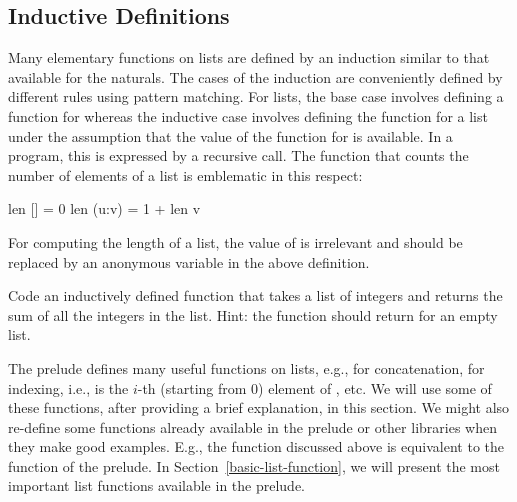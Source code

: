 \subsection{Inductive Definitions}

Many elementary functions on lists are defined by an induction similar
to that available for the naturals.
The cases of the induction are conveniently defined by
different rules using pattern matching.
For lists, the base case involves defining a function for \code{[]}
whereas the inductive case involves defining the function for
a list  under the assumption that the value of the
function for  is available.
In a program, this is expressed by a recursive call.
The function that counts the number of elements of a list
is emblematic in this respect:
%
\begin{prog}
len []    = 0
len (u:v) = 1 + len v
\end{prog}
%
For computing the length of a list, the value of  is irrelevant and
 should be replaced by an anonymous variable in the above
definition.
%
\begin{exercise}
Code an inductively defined function that takes a list of integers and
returns the sum of all the integers in the list.
Hint: the function should return  for an empty list.
\end{exercise}
%
The prelude defines many useful functions on lists,
e.g., \ccode{++} for concatenation, \ccode{!!} for indexing,
i.e.,  is the $i$-th (starting from 0) element of ,
etc.  We will use some of these functions, after providing a brief
explanation, in this section.  We might also re-define some functions
already available in the prelude or other libraries
when they make good examples.  E.g., the function 
discussed above is equivalent to the function 
of the prelude.
In Section~\ref{basic-list-function}, we will present the
most important list functions available in the prelude.

